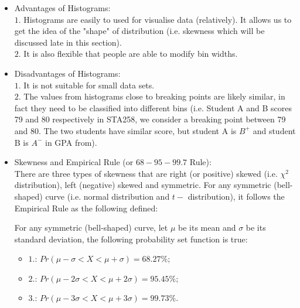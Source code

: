 \begin{itemize}
	\item Advantages of Histograms:\\
	$1.$ Histograms are easily to used for visualise data (relatively). It allows us to get the idea of the "shape" of distribution (i.e. skewness which will be discussed late in this section).\\
	$2.$ It is also flexible that people are able to modify bin widths.
	\item Disadvantages of Histograms:\\
	$1.$ It is not suitable for small data sets.\\
	$2.$ The values from histograms close to breaking points are likely similar, in fact they need to be classified into different bins (i.e. Student A and B scores 79 and 80 respectively in 		STA258, we consider a breaking point between 79 and 80. The two students have similar score, but student A is $B^+$ and student B is $A^-$ in GPA from).
	\item Skewness and Empirical Rule (or $68-95-99.7$ Rule):\\
		There are three types of skewness that are right (or positive) skewed (i.e. $\chi^{2}$ distribution), left (negative) skewed and symmetric. For any symmetric (bell-shaped) curve (i.e. normal distribution and $t-$ distribution), it follows the Empirical Rule as the following defined:
		\begin{definition}
		For any symmetric (bell-shaped) curve, let $\mu$ be its mean and $\sigma$ be its standard deviation, the following probability set function is true:
			\begin{itemize}
				\item  $1.$: $Pr(\mu - \sigma < X < \mu + \sigma) = 68.27\%;$
				\item  $2.$: $Pr(\mu - 2\sigma < X < \mu + 2\sigma) = 95.45\%;$
				\item  $3.$: $Pr(\mu - 3\sigma < X < \mu + 3\sigma) = 99.73\%.$
			\end{itemize}
		\end{definition}
		
\end{itemize}


